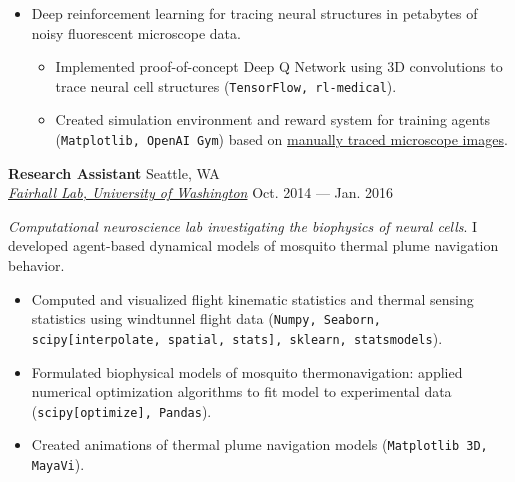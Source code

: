 \documentclass[a4paper,12pt]{article}
\newcommand{\ressubheading}[4]{{\begin{minipage}{\textwidth}
                                    \textbf{#1} \hfill #2 \\
                                    \textit{#3} \hfill #4 \\
\end{minipage}}}
\begin{document}
    \begin{itemize}
        \item Deep reinforcement learning for tracing neural structures in petabytes of noisy fluorescent microscope data.

        \begin{itemize}
            \item Implemented proof-of-concept Deep Q Network using 3D convolutions to trace neural cell structures (\texttt{TensorFlow, rl-medical}).
            \item Created simulation environment and reward system for training agents (\texttt{Matplotlib, OpenAI Gym}) based on \href{https://static-content.springer.com/esm/art%3A10.1038%2Fs41467-019-11443-y/MediaObjects/41467_2019_11443_MOESM4_ESM.mp4}{manually traced microscope images}.

        \end{itemize}

    \end{itemize}



    \ressubheading{Research Assistant}{Seattle, WA}{\href{https://compneuro.washington.edu/}{Fairhall Lab, University of Washington}}{Oct. 2014 --- Jan. 2016}

    \vspace{-6pt} \textit{Computational neuroscience lab investigating the biophysics of neural cells}. I developed agent-based dynamical models of mosquito thermal plume navigation behavior.

    \begin{itemize}
        \item Computed and visualized flight kinematic statistics and thermal sensing statistics using windtunnel flight data (\texttt{Numpy, Seaborn, scipy[interpolate, spatial, stats], sklearn, statsmodels}).
        \item Formulated biophysical models of mosquito thermonavigation:
        applied numerical optimization algorithms to fit model to experimental data (\texttt{scipy[optimize], Pandas}).
        \item Created animations of thermal plume navigation models (\texttt{Matplotlib 3D, MayaVi}).
    \end{itemize}
\end{document}

